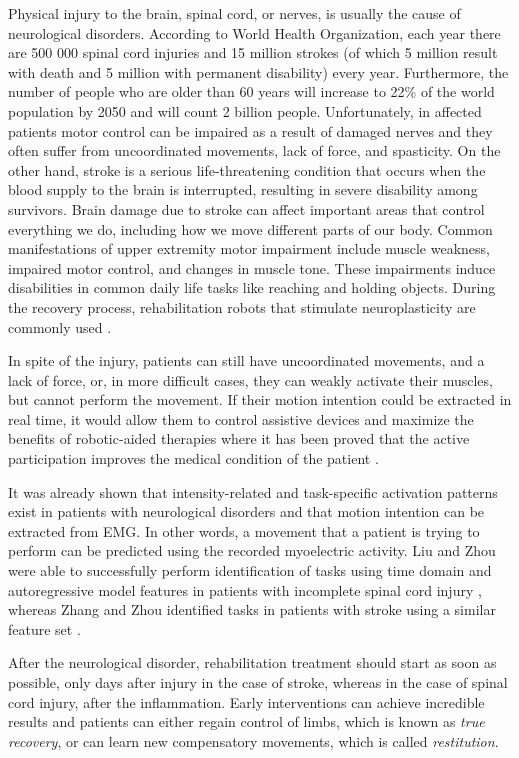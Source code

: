 Physical injury to the brain, spinal cord, or nerves, is usually the cause of neurological disorders. According to World Health Organization, each year there are 500 000 spinal cord injuries and 15 million strokes (of which 5 million result with death and 5 million with permanent disability) every year. Furthermore, the number of people who are older than 60 years will increase to 22\% of the world population by 2050 and will count 2 billion people. Unfortunately, in affected patients motor control can be impaired as a result of damaged nerves and they often suffer from uncoordinated movements, lack of force, and spasticity. On the other hand, stroke is a serious life-threatening condition that occurs when the blood supply to the brain is interrupted, resulting in severe disability among survivors. Brain damage due to stroke can affect important areas that control everything we do, including how we move different parts of our body. Common manifestations of upper extremity motor impairment include muscle weakness, impaired motor control, and changes in muscle tone. These impairments induce disabilities in common daily life tasks like reaching and holding objects. During the recovery process, rehabilitation robots that stimulate neuroplasticity are commonly used \citep{VacaBenitez2013, Dipietro2005, Marchal-Crespo2009, Cesqui2013}. 

In spite of the injury, patients can still have uncoordinated movements, and a lack of force, or, in more difficult cases, they can weakly activate their muscles, but cannot perform the movement. If their motion intention could be extracted in real time, it would allow them to control assistive devices and maximize the benefits of robotic-aided therapies where it has been proved that the active participation improves the medical condition of the patient \citep{Hogan2006}.

It was already shown that intensity-related and task-specific activation patterns exist in patients with neurological disorders and that motion intention can be extracted from EMG. In other words, a movement that a patient is trying to perform can be predicted using the recorded myoelectric activity. Liu and Zhou were able to successfully perform identification of tasks using time domain and autoregressive model features in patients with incomplete spinal cord injury \citep{Liu2013}, whereas Zhang and Zhou identified tasks in patients with stroke using a similar feature set \citep{Zhang2012}.

After the neurological disorder, rehabilitation treatment should start as soon as possible, only days after injury in the case of stroke, whereas in the case of spinal cord injury, after the inflammation. Early interventions can achieve incredible results and patients can either regain control of limbs, which is known as \emph{true recovery}, or can learn new compensatory movements, which is called \emph{restitution}. 


